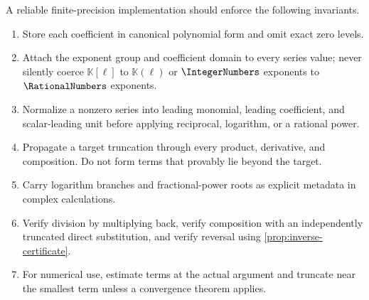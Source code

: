 \documentclass[11pt,oneside]{article}
\numberwithin{equation}{section}
\theoremstyle{definition}
\newcommand{\K}{\mathbb{K}}
\begin{document}
A reliable finite-precision implementation should enforce the following
invariants.

\begin{enumerate}
\item Store each coefficient in canonical polynomial form and omit exact zero
  levels.
\item Attach the exponent group and coefficient domain to every series value;
  never silently coerce \(\K[\ell]\) to \(\K(\ell)\) or \(\IntegerNumbers\) exponents to
  \(\RationalNumbers\) exponents.
\item Normalize a nonzero series into leading monomial, leading coefficient,
  and scalar-leading unit before applying reciprocal, logarithm, or a rational
  power.
\item Propagate a target truncation through every product, derivative, and
  composition.  Do not form terms that provably lie beyond the target.
\item Carry logarithm branches and fractional-power roots as explicit metadata
  in complex calculations.
\item Verify division by multiplying back, verify composition with an
  independently truncated direct substitution, and verify reversal using
  \cref{prop:inverse-certificate}.
\item For numerical use, estimate terms at the actual argument and truncate
  near the smallest term unless a convergence theorem applies.
\end{enumerate}
\end{document}
